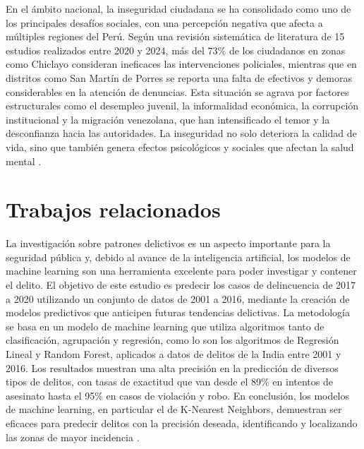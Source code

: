 \documentclass[runningheads]{llncs}
\begin{document}
En el ámbito nacional, la inseguridad ciudadana se ha consolidado como uno de
los principales desafíos sociales, con una percepción negativa que afecta a
múltiples regiones del Perú. Según una revisión sistemática de literatura de 15
estudios realizados entre 2020 y 2024, más del 73\% de los ciudadanos en zonas
como Chiclayo consideran ineficaces las intervenciones policiales, mientras que
en distritos como San Martín de Porres se reporta una falta de efectivos y
demoras considerables en la atención de denuncias. Esta situación se agrava por
factores estructurales como el desempleo juvenil, la informalidad económica, la
corrupción institucional y la migración venezolana, que han intensificado el
temor y la desconfianza hacia las autoridades. La inseguridad no solo deteriora
la calidad de vida, sino que también genera efectos psicológicos y sociales que
afectan la salud mental \cite{anton-chunga2025}.

\section{Trabajos relacionados}

La investigación sobre patrones delictivos es un aspecto importante para la
seguridad pública y, debido al avance de la inteligencia artificial, los
modelos de machine learning son una herramienta excelente para poder investigar
y contener el delito. El objetivo de este estudio es predecir los casos de
delincuencia de 2017 a 2020 utilizando un conjunto de datos de 2001 a 2016,
mediante la creación de modelos predictivos que anticipen futuras tendencias
delictivas. La metodología se basa en un modelo de machine learning que utiliza
algoritmos tanto de clasificación, agrupación y regresión, como lo son los
algoritmos de Regresión Lineal y Random Forest, aplicados a datos de delitos de
la India entre 2001 y 2016. Los resultados muestran una alta precisión en la
predicción de diversos tipos de delitos, con tasas de exactitud que van desde
el 89\% en intentos de asesinato hasta el 95\% en casos de violación y robo. En
conclusión, los modelos de machine learning, en particular el de K-Nearest
Neighbors, demuestran ser eficaces para predecir delitos con la precisión
deseada, identificando y localizando las zonas de mayor incidencia
\cite{s2024}.
\end{document}

